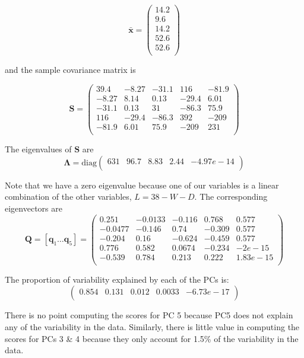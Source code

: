 \documentclass[]{book}
\theoremstyle{definition}
\theoremstyle{definition}
\theoremstyle{definition}
\theoremstyle{remark}
\begin{document}
\[\bar{\boldsymbol x} =\begin{pmatrix}14.2 \\9.6 \\14.2 \\52.6 \\52.6 \\\end{pmatrix}\]

and the sample covariance matrix is

\begin{equation}
\boldsymbol S= \begin{pmatrix}39.4&-8.27&-31.1&116&-81.9 \\-8.27&8.14&0.13&-29.4&6.01 \\-31.1&0.13&31&-86.3&75.9 \\116&-29.4&-86.3&392&-209 \\-81.9&6.01&75.9&-209&231 \\\end{pmatrix}
\label{eq:PLES}
\end{equation}

The eigenvalues of \(\boldsymbol S\) are
\[\boldsymbol \Lambda= \text{diag}\begin{pmatrix}631&96.7&8.83&2.44&-4.97e-14 \\\end{pmatrix}\]

Note that we have a zero eigenvalue because one of our variables is a linear combination of the other variables, \(L = 38 - W - D\). The corresponding eigenvectors are
\[\boldsymbol Q= [\boldsymbol q_1 \ldots \boldsymbol q_5] =\begin{pmatrix}0.251&-0.0133&-0.116&0.768&0.577 \\-0.0477&-0.146&0.74&-0.309&0.577 \\-0.204&0.16&-0.624&-0.459&0.577 \\0.776&0.582&0.0674&-0.234&-2e-15 \\-0.539&0.784&0.213&0.222&1.83e-15 \\\end{pmatrix}\]

The proportion of variability explained by each of the PCs is:
\[
\begin{pmatrix}0.854&0.131&0.012&0.0033&-6.73e-17 \\\end{pmatrix}
\]

There is no point computing the scores for PC 5 because PC5 does not explain any of the variability in the data. Similarly, there is little value in computing the scores for PCs 3 \& 4 because they only account for 1.5\% of the variability in the data.
\end{document}
